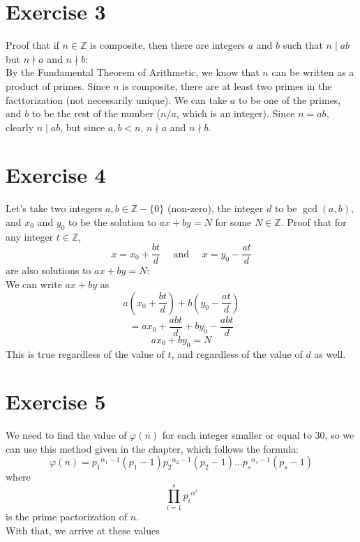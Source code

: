 \documentclass[12pt]{article}
\newcommand{\Z}{\mathbb{Z}}
\begin{document}
    \section*{Exercise 3}
    Proof that if $n \in \Z$ is composite,
    then there are integers $a$ and $b$
    such that $n \mid ab$ but $n \nmid a$ and $n \nmid b$: \\
    By the Fundamental Theorem of Arithmetic, 
    we know that $n$ can be written as a product of primes.
    Since $n$ is composite,
    there are at least two primes in the facttorization
    (not necessarily unique).
    We can take $a$ to be one of the primes,
    and $b$ to be the rest of the number ($n/a$, which is an integer).
    Since $n = ab$, clearly $n \mid ab$,
    but since $a, b < n$,
    $n \nmid a$ and $n \nmid b$. \\

    \section*{Exercise 4}
    Let's take two integers $a, b \in \Z - \{0\}$ (non-zero),
    the integer $d$ to be $\gcd(a, b)$,
    and $x_0$ and $y_0$ to be the solution to $ax + by = N$
    for some $N \in \Z$.
    Proof that for any integer $t \in \Z$,
    \[ x = x_0 + \dfrac{bt}{d} 
    \quad \text{ and } \quad
    x = y_0 - \dfrac{at}{d}  \]
    are also solutions to $ax + by = N$: \\
    We can write $ax + by$ as
    \[ a\left( x_0 + \dfrac{bt}{d} \right)
    + b\left( y_0 - \dfrac{at}{d} \right) \]
    \[ = ax_0 + \dfrac{abt}{d}
    + by_0 - \dfrac{abt}{d} \]
    \[ ax_0 + by_0 = N \]
    This is true regardless of the value of $t$,
    and regardless of the value of $d$ as well. \\

    \section*{Exercise 5}
    We need to find the value of $\varphi(n)$
    for each integer smaller or equal to $30$,
    so we can use this method given in the chapter,
    which follows the formula:
    \[ \varphi(n)
    = {p_1}^{\alpha_1 - 1}(p_1 - 1){p_2}^{\alpha_2 - 1}(p_2 - 1)
    \dots {p_s}^{\alpha_s - 1}(p_s - 1) \]
    where
    \[ \prod_{i=1}^s {p_i}^{\alpha^i} \]
    is the prime pactorization of $n$. \\
    With that, we arrive at these values
    
\end{document}
